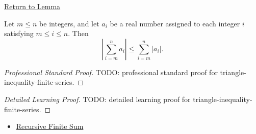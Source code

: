 \newpage
{}
\label{prf:triangle-inequality-finite-series}

\begin{remark*}[Return]
\hyperref[lem:triangle-inequality-finite-series]{Return to Lemma}
\end{remark*}

\begin{lemma*}
Let \(m \le n\) be integers, and let \(a_i\) be a real number assigned
to each integer \(i\) satisfying \(m \le i \le n\). Then
\[
  \left\lvert \sum_{i=m}^{n} a_i \right\rvert
  \le
  \sum_{i=m}^{n} \lvert a_i\rvert.
\]
\end{lemma*}

\begin{proof}[Professional Standard Proof]
\LRAProofBodyStart
TODO: professional standard proof for triangle-inequality-finite-series.
\end{proof}

\begin{proof}[Detailed Learning Proof]
\LRAProofBodyStart
TODO: detailed learning proof for triangle-inequality-finite-series.
\end{proof}

\begin{remark*}
\end{remark*}

\begin{dependencies}
\begin{itemize}
  \item \hyperref[def:recursive-finite-sum]{Recursive Finite Sum}
\end{itemize}
\end{dependencies}

\clearpage
